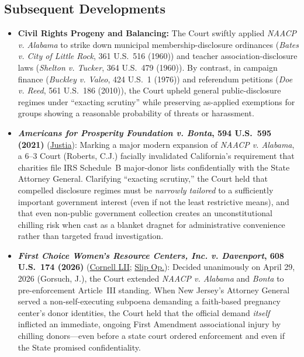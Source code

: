 \documentclass[12pt]{article}
\begin{document}
\subsection{Subsequent Developments}

\begin{itemize}

\item \textbf{Civil Rights Progeny and Balancing:} The Court swiftly applied \textit{NAACP v. Alabama} to strike down municipal membership-disclosure ordinances (\textit{Bates v. City of Little Rock}, 361 U.S.\ 516 (1960)) and teacher association-disclosure laws (\textit{Shelton v. Tucker}, 364 U.S.\ 479 (1960)). By contrast, in campaign finance (\textit{Buckley v. Valeo}, 424 U.S.\ 1 (1976)) and referendum petitions (\textit{Doe v. Reed}, 561 U.S.\ 186 (2010)), the Court upheld general public-disclosure regimes under ``exacting scrutiny'' while preserving as-applied exemptions for groups showing a reasonable probability of threats or harassment.
  \item \textbf{\textit{Americans for Prosperity Foundation v. Bonta}, 594 U.S.\ 595 (2021)} (\href{https://supreme.justia.com/cases/federal/us/594/19-251/}{Justia}): Marking a major modern expansion of \textit{NAACP v. Alabama}, a 6--3 Court (Roberts, C.J.) facially invalidated California's requirement that charities file IRS Schedule~B major-donor lists confidentially with the State Attorney General. Clarifying ``exacting scrutiny,'' the Court held that compelled disclosure regimes must be \textit{narrowly tailored} to a sufficiently important government interest (even if not the least restrictive means), and that even non-public government collection creates an unconstitutional chilling risk when cast as a blanket dragnet for administrative convenience rather than targeted fraud investigation.

\item \textbf{\textit{First Choice Women's Resource Centers, Inc. v. Davenport}, 608 U.S.\ 174 (2026)} (\href{https://www.law.cornell.edu/supremecourt/text/24-781}{Cornell LII}; \href{https://www.supremecourt.gov/opinions/25pdf/608us1r30_3f14.pdf}{Slip Op.}): Decided unanimously on April 29, 2026 (Gorsuch, J.), the Court extended \textit{NAACP v. Alabama} and \textit{Bonta} to pre-enforcement Article~III standing. When New Jersey's Attorney General served a non-self-executing subpoena demanding a faith-based pregnancy center's donor identities, the Court held that the official demand \textit{itself} inflicted an immediate, ongoing First Amendment associational injury by chilling donors---even before a state court ordered enforcement and even if the State promised confidentiality.

\end{itemize}
\end{document}

